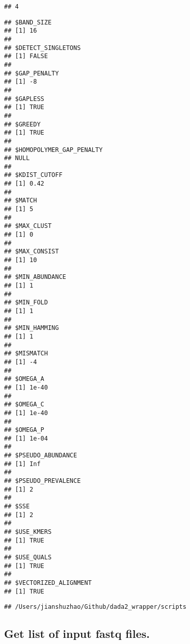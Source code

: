 \documentclass[
]{article}
\begin{document}
\begin{verbatim}
## 4
\end{verbatim}

\begin{verbatim}
## $BAND_SIZE
## [1] 16
## 
## $DETECT_SINGLETONS
## [1] FALSE
## 
## $GAP_PENALTY
## [1] -8
## 
## $GAPLESS
## [1] TRUE
## 
## $GREEDY
## [1] TRUE
## 
## $HOMOPOLYMER_GAP_PENALTY
## NULL
## 
## $KDIST_CUTOFF
## [1] 0.42
## 
## $MATCH
## [1] 5
## 
## $MAX_CLUST
## [1] 0
## 
## $MAX_CONSIST
## [1] 10
## 
## $MIN_ABUNDANCE
## [1] 1
## 
## $MIN_FOLD
## [1] 1
## 
## $MIN_HAMMING
## [1] 1
## 
## $MISMATCH
## [1] -4
## 
## $OMEGA_A
## [1] 1e-40
## 
## $OMEGA_C
## [1] 1e-40
## 
## $OMEGA_P
## [1] 1e-04
## 
## $PSEUDO_ABUNDANCE
## [1] Inf
## 
## $PSEUDO_PREVALENCE
## [1] 2
## 
## $SSE
## [1] 2
## 
## $USE_KMERS
## [1] TRUE
## 
## $USE_QUALS
## [1] TRUE
## 
## $VECTORIZED_ALIGNMENT
## [1] TRUE
\end{verbatim}

\begin{verbatim}
## /Users/jianshuzhao/Github/dada2_wrapper/scripts
\end{verbatim}

\hypertarget{get-list-of-input-fastq-files.}{%
\subsection{Get list of input fastq
files.}\label{get-list-of-input-fastq-files.}}
\end{document}
